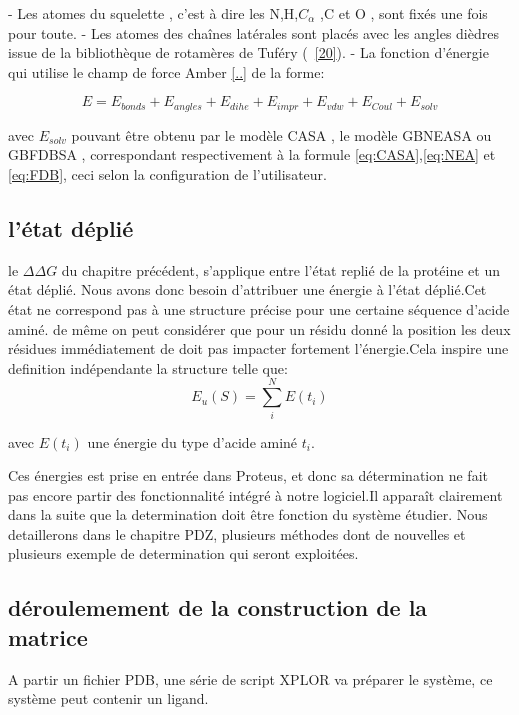 - Les atomes du squelette , c'est à dire les N,H,$C_\alpha$ ,C et O , sont fixés une fois pour toute. 
- Les atomes des chaînes latérales sont placés avec les angles dièdres issue de la bibliothèque de rotamères de Tuféry (~\ref{20}).
- La fonction d'énergie qui utilise le champ de force Amber \ref{..} de la forme:

\begin{equation} \label{eq:energy}
E = E_{bonds} + E_{angles} + E_{dihe} + E_{impr} + E_{vdw} + E_{Coul} + E_{solv} 
\end{equation}

avec $E_{solv}$ pouvant être obtenu par le modèle CASA , le modèle GBNEASA ou GBFDBSA , correspondant respectivement à la formule \ref{eq:CASA},\ref{eq:NEA} et \ref{eq:FDB}, ceci selon la configuration de l'utilisateur.


\subsection{l'état déplié}

le $\Delta \Delta G$ du chapitre précédent, s'applique entre l'état replié de la protéine et un état déplié. Nous avons donc besoin d'attribuer une énergie à l'état déplié.Cet état ne correspond pas à une structure précise pour une certaine séquence d'acide aminé. de même on peut considérer que pour un résidu donné la position les deux résidues immédiatement de doit pas impacter fortement l'énergie.Cela inspire une definition indépendante la structure telle que:
\begin{equation}
E_u(S) = \sum_i^N E(t_i)  
\end{equation}

avec $E(t_i)$ une énergie du type d'acide aminé $t_i$.

Ces énergies est prise en entrée dans Proteus, et donc sa détermination ne fait pas encore partir des fonctionnalité intégré à notre logiciel.Il apparaît clairement dans la suite que la determination doit être fonction du système étudier. Nous detaillerons dans le chapitre PDZ, plusieurs méthodes dont de nouvelles et plusieurs exemple de determination qui seront exploitées.



\subsection{déroulemement de la construction de la matrice}
\label{sub:matrix}
A partir un fichier PDB, une série de script XPLOR va préparer le système, ce système peut contenir un ligand.

